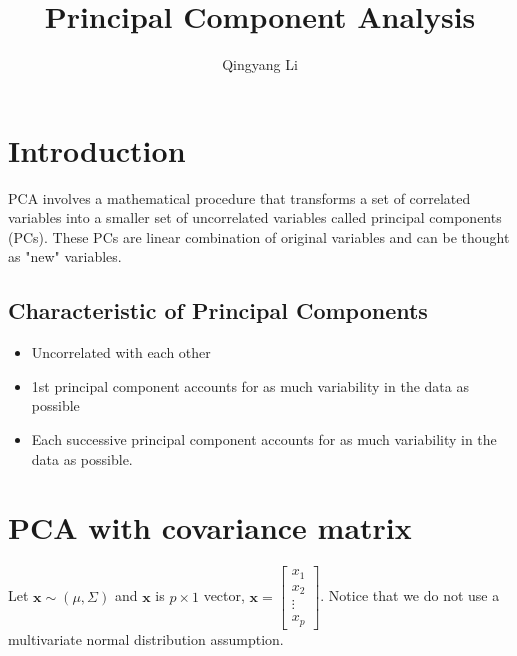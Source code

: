 \documentclass{article}
\title{Principal Component Analysis}
\author{Qingyang Li}
\date{}
\begin{document}
\maketitle

\section{Introduction}
PCA involves a mathematical procedure that transforms a set of correlated variables into a smaller set of uncorrelated variables called principal components (PCs). These PCs are linear combination of original variables and can be thought as "new" variables.
\subsection{Characteristic of Principal Components}
\begin{itemize}
    \item Uncorrelated with each other
    \item 1st principal component accounts for as much variability in the data as possible
    \item Each successive principal component accounts for as much variability in the data as possible.
\end{itemize}

\section{PCA with covariance matrix}
Let $\mathbf{x} \sim (\mu,\Sigma)$ and $\mathbf{x}$ is $p\times 1$ vector,
$\mathbf{x}=
\begin{bmatrix}
x_1 \\
x_2 \\
\vdots \\
x_p
\end{bmatrix}$. 
Notice that we do not use a multivariate normal distribution assumption.
\end{document}
